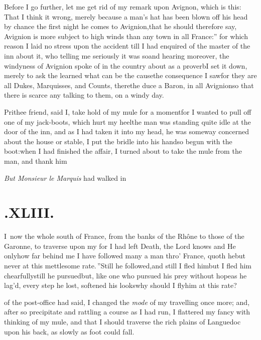 \documentclass{article}
\begin{document}
Before I go further, let me get rid of my remark upon
Avignon, which is this: That I think it wrong, merely because a man’s
hat has been blown off his head by chance the first night he comes
to Avig\-nion,\tsh that he should therefore say,\break
\lqq Avignion is more subject to high winds than any town
in all France:” for which reason I laid no stress upon
the accident till I had enquired of the master of the inn about it,
who telling me seriously it was so\tsh and hearing
moreover, the windyness of Avignion spoke of in the country
about as a proverb\tsh I set it down, merely to ask the
learned what can be the cause\tsh the consequence I
saw\tsk for they are all Dukes, Marquisses, and Counts,
there\tsh the duce a Baron, in all
Avignion\tsh so that there is scarce any talking to
them, on a windy day.

Prithee friend, said I, take hold of my mule for a
moment\tsh for I wanted to pull off one of my jack-boots,
which hurt my heel\tsk the man was standing quite idle at the
door of the inn, and as I had taken it into my head, he was someway
concerned about the house or stable, I put the bridle into his hand\tsk so
begun with the boot:\tsk when I had finished the affair, I turned
about to take the mule from the man, and thank
him\tsh

\tsh \textit{But Monsieur le Marquis} had walked
in\tsh

\vfill{}\eject
\section{.\enspace XLIII.}

\lettrine{I}{\,} now the whole south of
France, from the banks of the Rhône to those of
the Garonne, to traverse upon my \break
\tsh for I had left Death, the Lord knows\break
\tsh and He only\tsk how far behind me\break
\tsh \lqq I have followed many a man thro’
France, quoth he\tsk but never at this mettlesome
rate.\,”\tsh Still he followed,\tsh and still
I fled him\tsh but I fled him
chearfully\tsh still he pursued\tsh but, like one
who pursued his prey without hope\tsh as he lag’d,
every step he lost, softened his looks\tsh why should I
fly\break him at this rate?

\noindent
{}\break 
of the post-office had said, I changed the
\textit{mode} of my travelling once more; and,
after so precipitate and rattling a course as I had run, I
flattered my fancy with thinking of my mule, and that I should
traverse the rich plains of Languedoc upon his back, as
slowly as foot could fall.
\end{document}
